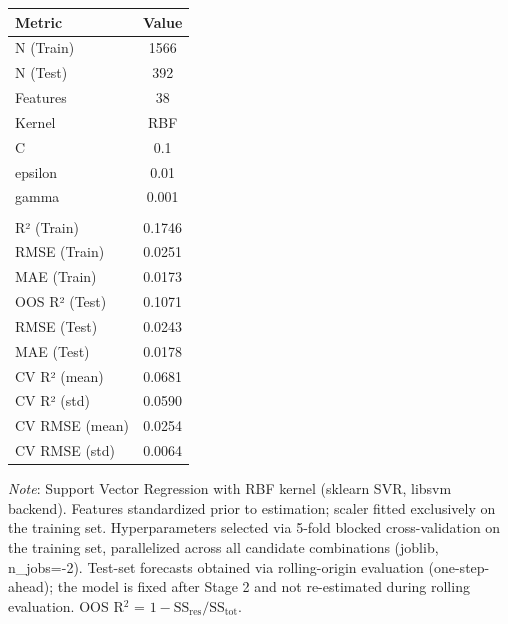 \begin{tabular}{lc}
  \toprule
  \textbf{Metric} & \textbf{Value} \\ 
  \midrule
  N (Train) & 1566 \\ 
  N (Test) & 392 \\ 
  Features & 38 \\ 
  Kernel & RBF \\ 
  C & 0.1 \\ 
  epsilon & 0.01 \\ 
  gamma & 0.001 \\ 
   &  \\ 
  R² (Train) & 0.1746 \\ 
  RMSE (Train) & 0.0251 \\ 
  MAE (Train) & 0.0173 \\ 
  OOS R² (Test) & 0.1071 \\ 
  RMSE (Test) & 0.0243 \\ 
  MAE (Test) & 0.0178 \\ 
  CV R² (mean) & 0.0681 \\ 
  CV R² (std) & 0.0590 \\ 
  CV RMSE (mean) & 0.0254 \\ 
  CV RMSE (std) & 0.0064 \\ 
  \bottomrule
\end{tabular}
\par\vspace{4pt}
\begin{minipage}{\linewidth}
  \footnotesize \textit{Note}: Support Vector Regression with RBF kernel (sklearn SVR, libsvm backend). Features standardized prior to estimation; scaler fitted exclusively on the training set. Hyperparameters selected via 5-fold blocked cross-validation on the training set, parallelized across all candidate combinations (joblib, n\_jobs=-2). Test-set forecasts obtained via rolling-origin evaluation (one-step-ahead); the model is fixed after Stage 2 and not re-estimated during rolling evaluation. OOS R$^2$ = $1 - \text{SS}_{\text{res}} / \text{SS}_{\text{tot}}$.
\end{minipage}